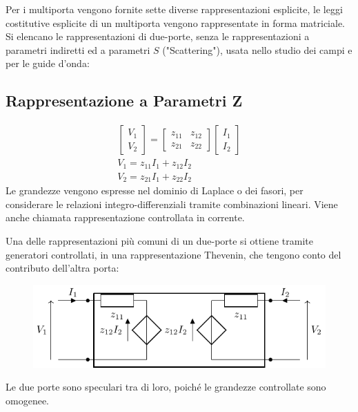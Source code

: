 \documentclass{article}
\numberwithin{equation}{subsection}
\begin{document}
Per i multiporta vengono fornite sette diverse rappresentazioni esplicite, le leggi costitutive esplicite di un multiporta vengono rappresentate in forma matriciale. Si elencano 
le rappresentazioni di due-porte, senza le rappresentazioni a parametri indiretti ed a parametri $S$ ("Scattering"), usata nello studio dei campi e per le guide d'onda:

\subsection{Rappresentazione a Parametri Z}

\begin{gather*}
    \begin{bmatrix}
        V_1\\V_2
    \end{bmatrix}=\begin{bmatrix}
        z_{11}&z_{12}\\z_{21}&z_{22}
    \end{bmatrix}\begin{bmatrix}
        I_1\\I_2
    \end{bmatrix}\\
    V_1=z_{11}I_1+z_{12}I_2\\
    V_2=z_{21}I_1+z_{22}I_2
\end{gather*}
Le grandezze vengono espresse nel dominio di Laplace o dei fasori, per considerare le relazioni integro-differenziali tramite combinazioni lineari. Viene anche chiamata 
rappresentazione controllata in corrente. 

Una delle rappresentazioni più comuni di un due-porte si ottiene tramite generatori controllati, in una rappresentazione Thevenin, che tengono conto del contributo dell'altra 
porta:
\begin{figure}[H]%
    \centering
    \includegraphics{rappresentazione-parametri-z.pdf}%
    \label{fig:rappresentazione-parametri-z}
\end{figure}
Le due porte sono speculari tra di loro, poiché le grandezze controllate sono omogenee. 
\end{document}
